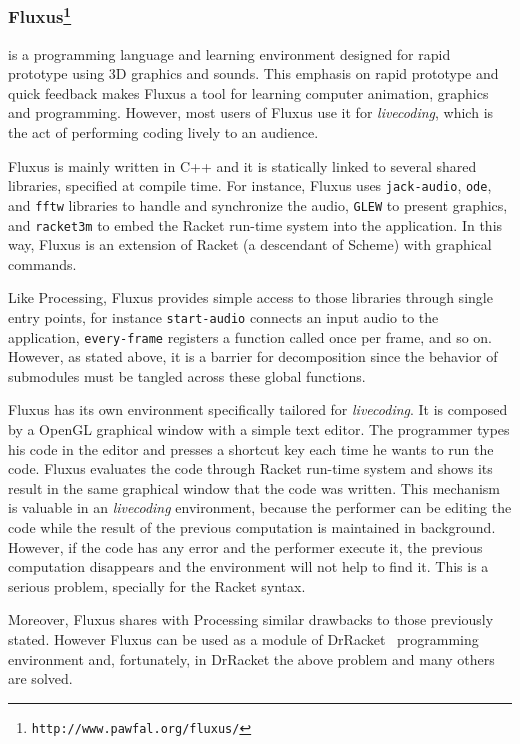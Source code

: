 \subsubsection{Fluxus\protect\footnote{\texttt{http://www.pawfal.org/fluxus/}}} is a programming language and learning environment designed for rapid prototype using 3D graphics and sounds. This emphasis on rapid prototype and quick feedback makes Fluxus a tool for learning computer animation, graphics and programming. However, most users of Fluxus use it for \textit{livecoding}, which is the act of performing coding lively to an audience.

Fluxus is mainly written in C++ and it is statically linked to several shared libraries, specified at compile time. For instance, Fluxus uses \texttt{jack-audio}, \texttt{ode}, and \texttt{fftw} libraries to handle and synchronize the audio, \texttt{GLEW} to present graphics, and \texttt{racket3m} to embed the Racket run-time system into the application. In this way, Fluxus is an extension of Racket (a descendant of Scheme) with graphical commands.

Like Processing, Fluxus provides simple access to those libraries through single entry points, for instance \texttt{start-audio} connects an input audio to the application, \texttt{every-frame} registers a function called once per frame, and so on. However, as stated above, it is a barrier for decomposition since the behavior of submodules must be tangled across these global functions.

Fluxus has its own environment specifically tailored for \textit{livecoding}. It is composed by a OpenGL graphical window with a simple text editor. The programmer types his code in the editor and presses a shortcut key each time he wants to run the code. Fluxus evaluates the code through Racket run-time system and shows its result in the same graphical window that the code was written. This mechanism is valuable in an \textit{livecoding} environment, because the performer can be editing the code while the result of the previous computation is maintained in background. However, if the code has any error and the performer execute it, the previous computation disappears and the environment will not help to find it. This is a serious problem, specially for the Racket syntax.

Moreover, Fluxus shares with Processing similar drawbacks to those previously stated. However Fluxus can be used as a module of DrRacket~\cite{findler2002drscheme} programming environment and, fortunately, in DrRacket the above problem and many others are solved.
